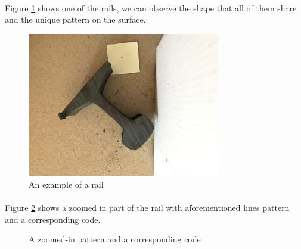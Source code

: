 \paragraph{}
Figure \ref{fig:example_of_a_rail} shows one of the rails, we can observe the shape that all of them share and the unique pattern on the surface. 
\begin{figure}[H]
	\centering
	\includegraphics[width=0.75\textwidth]{images/example_rail}
	\caption{An example of a rail}
	\label{fig:example_of_a_rail}
\end{figure}

\paragraph{}
Figure \ref{fig:pattern_to_code} shows a zoomed in part of the rail with aforementioned lines pattern and a corresponding code.
\begin{figure}[H]
     \centering
     \hfill
     \caption{A zoomed-in pattern and a corresponding code}
     \label{fig:pattern_to_code}
\end{figure}

